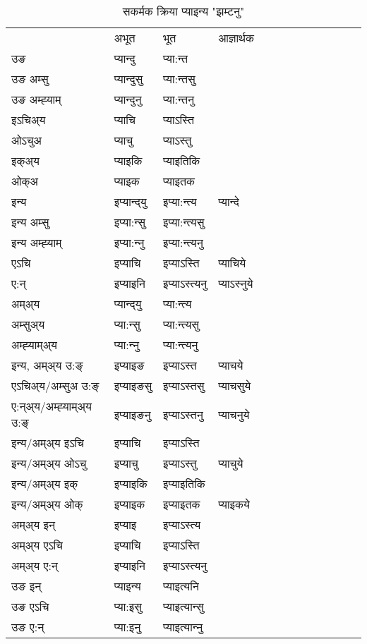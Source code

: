 \begin{table}[H]
\centering
\caption{\label{ɛnt.vt} सकर्मक क्रिया  प्याइन्य  "झम्टनु"  }
\begin{tabular}{l|l|l|l|l|l|l|l|l|l|l|l|l}  \toprule
&अभूत & भूत & आज्ञार्थक \\ 
उङ &प्यान्दु &प्या:न्त \\ 
उङ अम्सु&प्यान्दुसु &प्या:न्तसु \\ 
उङ अम्ह्‍याम्&प्यान्दुनु &प्या:न्तनु \\ 
इऽचिअ्य &प्याचि &प्याऽस्ति   \\ 
ओऽचुअ        &प्याचु &प्याऽस्तु   \\ 
इक्अ्य&प्याइकि &प्याइतिकि   \\ 
ओक्अ &प्याइक &प्याइतक   \\ 
इन्य & इप्यान्द्‌यु  & इप्या:न्त्य &प्यान्दे  \\ 
इन्य अम्सु& इप्या:न्सु  & इप्या:न्त्यसु   \\ 
इन्य अम्ह्‍याम्& इप्या:न्‍नु  & इप्या:न्त्यनु   \\ 
एऽचि & इप्याचि & इप्याऽस्ति &प्याचिये    \\ 
ए:न् & इप्याइनि  & इप्याऽस्त्यनु &प्याऽस्‍नुये  \\ 
अम्अ्य & प्यान्द्‌यु  & प्या:न्त्य  \\ 
अम्सुअ्य & प्या:न्सु & प्या:न्त्यसु  \\ 
अम्ह्‍याम्अ्य & प्या:न्‍नु  & प्या:न्त्यनु \\ 
\midrule
इन्य, अम्अ्य उ:ङ्‌ &इप्याइङ &इप्याऽस्त &प्याचये \\ 
एऽचिअ्य/अम्सुअ उ:ङ्‌ &इप्याइङसु &इप्याऽस्तसु &प्याचसुये \\ 
ए:न्अ्य/अम्ह्‍याम्अ्य उ:ङ्‌ &इप्याइङनु &इप्याऽस्तनु &प्याचनुये \\ 
इन्य/अम्अ्य इऽचि &इप्याचि &इप्याऽस्ति    \\ 
इन्य/अम्अ्य ओऽचु &इप्याचु &इप्याऽस्तु  &प्याचुये  \\ 
इन्य/अम्अ्य इक् &इप्याइकि &इप्याइतिकि   \\ 
इन्य/अम्अ्य ओक् &इप्याइक &इप्याइतक  &प्याइकये  \\ 
अम्अ्य इन् & इप्याइ & इप्याऽस्त्य   \\ 
अम्अ्य एऽचि & इप्याचि & इप्याऽस्ति    \\ 
अम्अ्य ए:न् & इप्याइनि  & इप्याऽस्त्यनु  \\ 
\midrule
उङ इन् & प्याइन्य  & प्याइत्यनि  \\ 
उङ एऽचि & प्या:इसु  & प्याइत्यान्सु   \\ 
उङ ए:न्& प्या:इनु  & प्याइत्यान्‍नु   \\ 
\bottomrule
\end{tabular}
\end{table}


